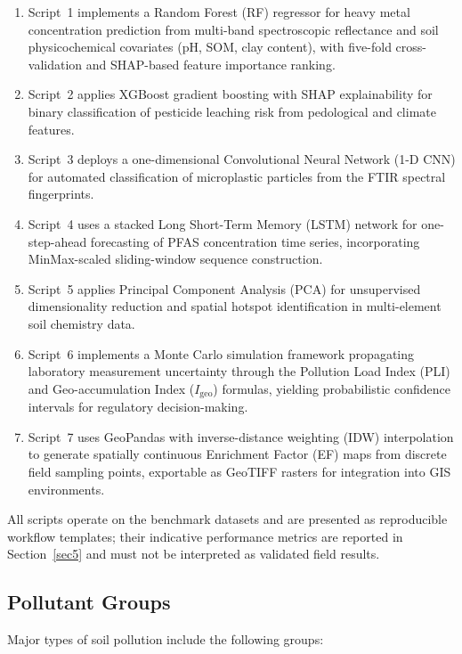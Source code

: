\documentclass[environments,article,submit,pdftex,moreauthors]{Definitions/mdpi}
\begin{document}
\begin{enumerate}
\item Script~1 implements a Random Forest (RF) regressor for heavy metal
concentration prediction from multi-band spectroscopic reflectance and
soil physicochemical covariates (pH, SOM, clay content), with
five-fold cross-validation and SHAP-based feature importance ranking.
\item Script~2 applies XGBoost gradient boosting with SHAP explainability
for binary classification of pesticide leaching risk from pedological
and climate features. 
\item Script~3 deploys a one-dimensional Convolutional
Neural Network (1-D CNN) for automated classification of microplastic
particles from the FTIR spectral fingerprints. 
\item Script~4 uses a
stacked Long Short-Term Memory (LSTM) network for one-step-ahead
forecasting of PFAS concentration time series, incorporating
MinMax-scaled sliding-window sequence construction. 
\item Script~5 applies
Principal Component Analysis (PCA) for unsupervised dimensionality
reduction and spatial hotspot identification in multi-element soil
chemistry data. 
\item Script~6 implements a Monte Carlo simulation framework
propagating laboratory measurement uncertainty through the Pollution
Load Index (PLI) and Geo-accumulation Index ($I_\mathrm{geo}$)
formulas, yielding probabilistic confidence intervals for regulatory
decision-making. 
\item Script~7 uses GeoPandas with inverse-distance
weighting (IDW) interpolation to generate spatially continuous
Enrichment Factor (EF) maps from discrete field sampling points,
exportable as GeoTIFF rasters for integration into GIS environments.
\end{enumerate}

All scripts operate on the benchmark datasets and are presented
as reproducible workflow templates; their indicative performance
metrics are reported in Section~\ref{sec5} and must not be interpreted
as validated field results.

\subsection{Pollutant Groups}\label{sec2.1}

Major types of soil pollution include the following groups:
\end{document}

